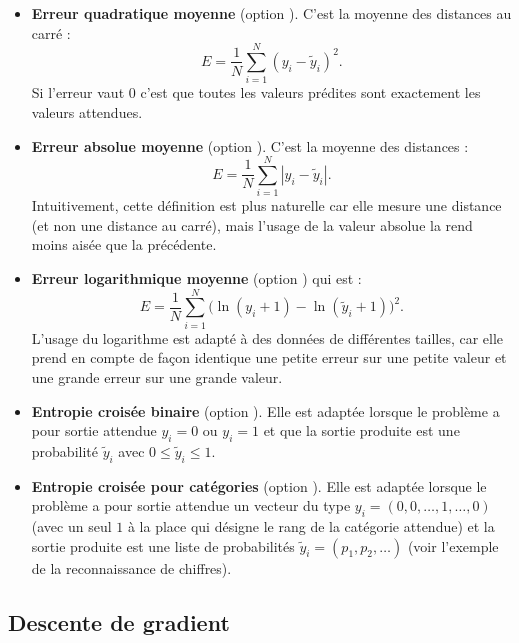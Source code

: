 \documentclass[11pt,class=report,crop=false]{standalone}
\begin{document}
\begin{itemize}
  \item \textbf{Erreur quadratique moyenne} (option ). C'est la moyenne des distances au carré :
  $$E = \frac{1}{N} \sum_{i=1}^N (y_i-\widetilde y_i)^2.$$
  Si l'erreur vaut $0$ c'est que toutes les valeurs prédites sont exactement les valeurs attendues.
  
  \item \textbf{Erreur absolue moyenne} (option ). C'est la moyenne des distances :
  $$E = \frac{1}{N} \sum_{i=1}^N |y_i-\widetilde y_i|.$$
  Intuitivement, cette définition est plus naturelle car elle mesure une distance (et non une distance au carré), mais l'usage de la valeur absolue la rend moins aisée que la précédente.
  
  \item \textbf{Erreur logarithmique moyenne} (option ) qui est :
  $$E = \frac{1}{N} \sum_{i=1}^N \big(\ln(y_i+1) - \ln(\widetilde y_i+1)\big)^2.$$
  L'usage du logarithme est adapté à des données de différentes tailles, car elle prend en compte de façon identique une petite erreur sur une petite valeur et une grande erreur sur une grande valeur.
  
  
  \item \textbf{Entropie croisée binaire} (option ). Elle est adaptée lorsque le problème a pour sortie attendue $y_i=0$ ou $y_i=1$ et que la sortie produite est une probabilité $\widetilde y_i$ avec $0 \le \widetilde y_i \le 1$.
  
  
  \item \textbf{Entropie croisée pour catégories}  (option ). Elle est adaptée lorsque le problème a pour sortie attendue un vecteur du type $y_i=(0,0,\ldots,1,\ldots,0)$ (avec un seul $1$ à la place qui désigne le rang de la catégorie attendue) et la sortie produite est une liste de probabilités $\widetilde y_i = (p_1,p_2,\ldots)$ (voir l'exemple de la reconnaissance de chiffres).
\end{itemize}


\subsection{Descente de gradient}
\end{document}
